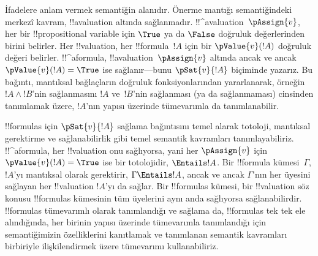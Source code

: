 İfadelere anlam vermek semantiğin alanıdır. Önerme mantığı semantiğindeki
merkezî kavram, !!a{valuation} altında sağlanmadır. !!^a{valuation}~$\pAssign{v}$,
her bir !!{propositional variable} için $\True$ ya da $\False$ doğruluk
değerlerinden birini belirler.
Her !!{valuation}, her !!{formula}~$!A$ için bir $\pValue{v}(!A)$ doğruluk
değeri belirler. !!^a{formula}, !!a{valuation}~$\pAssign{v}$ altında ancak ve
ancak $\pValue{v}(!A) = \True$ ise sağlanır---bunu $\pSat{v}{!A}$ biçiminde
yazarız. Bu bağıntı, mantıksal bağlaçların doğruluk fonksiyonlarından
yararlanarak, örneğin $!A \land !B$'nin sağlanmasını $!A$ ve~$!B$'nin
sağlanması (ya da sağlanmaması) cinsinden tanımlamak üzere, $!A$'nın yapısı
üzerinde tümevarımla da tanımlanabilir.

!!{formula}s için $\pSat{v}{!A}$ sağlama bağıntısını temel alarak totoloji,
mantıksal gerektirme ve
sağlanabilirlik gibi temel semantik kavramları tanımlayabiliriz.
!!^a{formula}, her !!{valuation} onu sağlıyorsa, yani her $\pAssign{v}$ için
$\pValue{v}(!A) = \True$ ise bir totolojidir, $\Entails !A$. Bir
!!{formula} kümesi~$\Gamma$, $!A$'yı mantıksal olarak gerektirir,
$\Gamma \Entails !A$, ancak ve ancak $\Gamma$'nın her üyesini sağlayan her
!!{valuation} $!A$'yı da sağlar. Bir
!!{formula}s kümesi, bir !!{valuation} söz konusu !!{formula}s kümesinin
tüm üyelerini aynı anda sağlıyorsa sağlanabilirdir. !!{formula}s tümevarımlı
olarak tanımlandığı ve sağlama da, !!{formula}s tek tek ele alındığında,
her birinin yapısı üzerinde tümevarımla
tanımlandığı için semantiğimizin özelliklerini kanıtlamak ve tanımlanan
semantik kavramları birbiriyle ilişkilendirmek üzere tümevarımı
kullanabiliriz.


